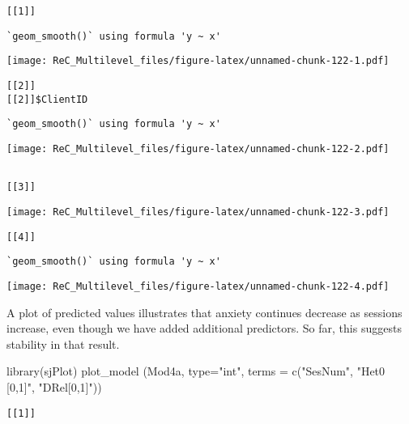 \documentclass[
  11pt,
]{book}
\newenvironment{Shaded}{\begin{snugshade}}{\end{snugshade}}
\newcommand{\AttributeTok}[1]{\textcolor[rgb]{0.77,0.63,0.00}{#1}}
\newcommand{\FunctionTok}[1]{\textcolor[rgb]{0.00,0.00,0.00}{#1}}
\newcommand{\NormalTok}[1]{#1}
\newcommand{\StringTok}[1]{\textcolor[rgb]{0.31,0.60,0.02}{#1}}
\begin{document}
\begin{verbatim}
[[1]]
\end{verbatim}

\begin{verbatim}
`geom_smooth()` using formula 'y ~ x'
\end{verbatim}

\texttt{[image: ReC\_Multilevel\_files/figure-latex/unnamed-chunk-122-1.pdf]}

\begin{verbatim}
[[2]]
[[2]]$ClientID
\end{verbatim}

\begin{verbatim}
`geom_smooth()` using formula 'y ~ x'
\end{verbatim}

\texttt{[image: ReC\_Multilevel\_files/figure-latex/unnamed-chunk-122-2.pdf]}

\begin{verbatim}

[[3]]
\end{verbatim}

\texttt{[image: ReC\_Multilevel\_files/figure-latex/unnamed-chunk-122-3.pdf]}

\begin{verbatim}
[[4]]
\end{verbatim}

\begin{verbatim}
`geom_smooth()` using formula 'y ~ x'
\end{verbatim}

\texttt{[image: ReC\_Multilevel\_files/figure-latex/unnamed-chunk-122-4.pdf]}

A plot of predicted values illustrates that anxiety continues decrease as sessions increase, even though we have added additional predictors. So far, this suggests stability in that result.

\begin{Shaded}
\begin{Highlighting}[]
\FunctionTok{library}\NormalTok{(sjPlot)}
\FunctionTok{plot\_model}\NormalTok{ (Mod4a, }\AttributeTok{type=}\StringTok{"int"}\NormalTok{, }\AttributeTok{terms =} \FunctionTok{c}\NormalTok{(}\StringTok{"SesNum"}\NormalTok{, }\StringTok{"Het0 [0,1]"}\NormalTok{, }\StringTok{"DRel[0,1]"}\NormalTok{))}
\end{Highlighting}
\end{Shaded}

\begin{verbatim}
[[1]]
\end{verbatim}
\end{document}
